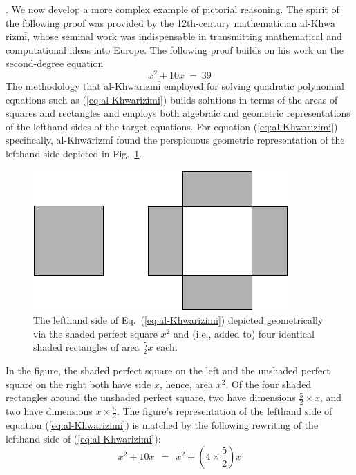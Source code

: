 .
We now develop a more complex example of pictorial reasoning.  The spirit of the following proof was provided by the 12th-century mathematician al-Khw$\bar{\mbox{a}}$rizm$\bar{\mbox{i}}$, whose seminal work \cite{Al-Khwarizmi} was indispensable in transmitting mathematical and computational ideas into Europe.  The following proof builds on his work on the second-degree equation
\begin{equation}
\label{eq:al-Khwarizimi}
x^2 + 10 x \ = \ 39
\end{equation}
The methodology that al-Khw$\bar{\mbox{a}}$rizm$\bar{\mbox{i}}$ employed for solving quadratic polynomial equations such as (\ref{eq:al-Khwarizimi}) builds solutions in terms of the areas of squares and rectangles and employs both algebraic and geometric representations of the lefthand sides of the target equations.  For equation (\ref{eq:al-Khwarizimi}) specifically, al-Khw$\bar{\mbox{a}}$rizm$\bar{\mbox{i}}$ found the perspicuous geometric representation of the lefthand side depicted in Fig.~\ref{fig:EqElKwarismi1}.
\begin{figure}[ht]
\begin{center}
       \includegraphics[scale=0.4]{FiguresArithmetic/EquationElKwarismi1}
\caption{The lefthand side of Eq.~(\ref{eq:al-Khwarizimi}) depicted geometrically via the shaded perfect square $x^2$ and (i.e., added to) four identical shaded rectangles of area $\frac{5}{2} x$ each.}
       \label{fig:EqElKwarismi1}
\end{center}
\end{figure}
In the figure, the shaded perfect square on the left and the unshaded perfect square on the right both have side $x$, hence, area $x^2$.  Of the four shaded rectangles around the unshaded perfect square, two have dimensions $\frac{5}{2} \times x$, and two have dimensions $x \times \frac{5}{2}$.  The figure's representation of the lefthand side of equation (\ref{eq:al-Khwarizimi}) is matched by the following rewriting of the lefthand side of (\ref{eq:al-Khwarizimi}):
\[ x^2 + 10 x \ \ = \ \ x^2 + \left( 4 \times \frac{5}{2} \right) x \]

